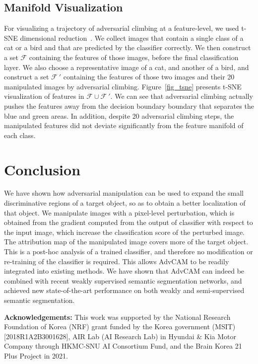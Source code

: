 \documentclass[final]{cvpr}
\begin{document}
\subsection{Manifold Visualization}
For visualizing a trajectory of adversarial climbing at a feature-level, we used t-SNE dimensional reduction~\cite{maaten2008visualizing}. 
We collect images that contain a single class of a cat or a bird and that are predicted by the classifier correctly. 
We then construct a set $\mathcal{F}$ containing the features of those images, before the final classification layer. 
We also choose a representative image of a cat, and another of a bird, and construct a set $\mathcal{F}~'$ containing the features of those two images and their 20 manipulated images by adversarial climbing.
Figure~\ref{fig_tsne} presents t-SNE visualization of features in $\mathcal{F} \cup \mathcal{F}~'$.
We can see that adversarial climbing actually pushes the features away from the decision boundary boundary that separates the blue and green areas.
In addition, despite 20 adversarial climbing steps, the manipulated features did not deviate significantly from the feature manifold of each class.






\section{Conclusion}
We have shown how adversarial manipulation can be used to expand the small discriminative regions of a target object, so as to obtain a better localization of that object.
We manipulate images with a pixel-level perturbation, which is obtained from the gradient computed from the output of classifier with respect to the input image, which increase the classification score of the perturbed image. The attribution map of the manipulated image covers more of the target object.
This is a post-hoc analysis of a trained classifier, and therefore no modification or re-training of the classifier is required.
This allows AdvCAM to be readily integrated into existing methods. We have shown that AdvCAM can indeed be combined with recent weakly supervised semantic segmentation networks, and achieved new state-of-the-art performance on both weakly and semi-supervised semantic segmentation. 

\bigskip
\noindent\textbf{Acknowledgements:}
This work was supported by the National Research Foundation of Korea (NRF) grant funded by the Korea government (MSIT) [2018R1A2B3001628], AIR Lab (AI Research Lab) in Hyundai \& Kia Motor Company through HKMC-SNU AI Consortium Fund, and the Brain Korea 21 Plus Project in 2021.
\end{document}
